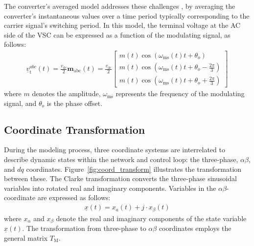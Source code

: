 The converter's averaged model addresses these challenges \autocite{sira2006control,middlebrook1976ieee}, by averaging the converter's instantaneous values over a time period typically corresponding to the carrier signal's switching period. In this model, the terminal voltage at the AC side of the VSC can be expressed as a function of the modulating signal, as follows:
\begin{equation}
    \begin{aligned}
        \underline{v}_{\mathrm{t}}^{abc}(t)=\frac{v_{\mathrm{dc}}}{2} \boldsymbol{m}_{\mathrm{abc}}(t)=\frac{v_{\mathrm{dc}}}{2}\left[\begin{array}{l}
        m(t) \cos \left(\omega_{\mathrm{ms}}(t) t+\theta_o\right) \\
        m(t) \cos \left(\omega_{\mathrm{ms}}(t) t+\theta_o-\frac{2 \pi}{3}\right) \\
        m(t) \cos \left(\omega_{\mathrm{ms}}(t) t+\theta_o+\frac{2 \pi}{3}\right)
        \end{array}\right]
    \end{aligned}
\end{equation}
where $m$ denotes the amplitude, $\omega_{\mathrm{ms}}$ represents the frequency of the modulating signal, and $\theta_o$ is the phase offset.

\subsection{Coordinate Transformation}

During the modeling process, three coordinate systems are interrelated to describe dynamic states within the network and control loop: the three-phase, $\alpha \beta$, and $dq$ coordinates. Figure~\cref{fig:coord_transform} illustrates the transformation between these. The Clarke transformation \autocite{6739414} converts the three-phase sinusoidal variables into rotated real and imaginary components. Variables in the $\alpha \beta$-coordinate are expressed as follows:
\begin{equation}
    \begin{aligned}
        \underline{x}(t)=x_a(t)+j \cdot x_\beta(t)
    \end{aligned}
\end{equation}
where $x_\alpha$ and $x_\beta$ denote the real and imaginary components of the state variable $\underline{x}(t)$. The transformation from three-phase to $\alpha \beta$ coordinates employs the general matrix $T_{\mathrm{M}}$.

